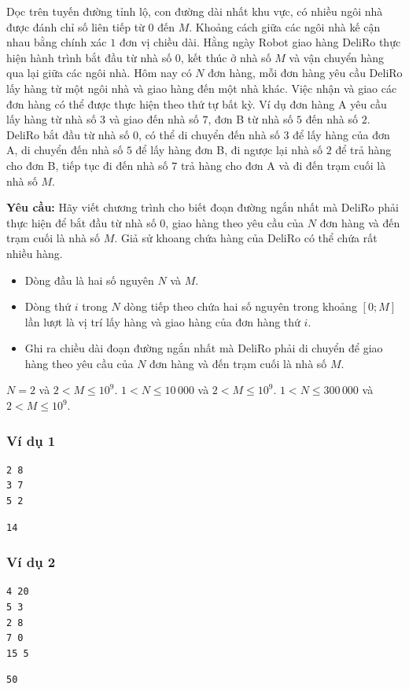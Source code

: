 
Dọc trên tuyến đường tỉnh lộ, con đường dài nhất khu vực, có nhiều ngôi nhà được đánh chỉ số liên tiếp từ $0$ đến $M$. Khoảng cách giữa các ngôi nhà kế cận nhau bằng chính xác $1$ đơn vị chiều dài. Hằng ngày Robot giao hàng DeliRo thực hiện hành trình bắt đầu từ nhà số $0$, kết thúc ở nhà số $M$ và vận chuyển hàng qua lại giữa các ngôi nhà. Hôm nay có $N$ đơn hàng, mỗi đơn hàng yêu cầu DeliRo lấy hàng từ một ngôi nhà và giao hàng đến một nhà khác. Việc nhận và giao các đơn hàng có thể được thực hiện theo thứ tự bất kỳ. Ví dụ đơn hàng A yêu cầu lấy hàng từ nhà số $3$ và giao đến nhà số $7$, đơn B từ nhà số $5$ đến nhà số $2$. DeliRo bắt đầu từ nhà số $0$, có thể di chuyển đến nhà số $3$ để lấy hàng của đơn A, di chuyển đến nhà số $5$ để lấy hàng đơn B, đi ngược lại nhà số $2$ để trả hàng cho đơn B, tiếp tục đi đến nhà số $7$ trả hàng cho đơn A và đi đến trạm cuối là nhà số $M$.

\medskip
\textbf{Yêu cầu:} Hãy viết chương trình cho biết đoạn đường ngắn nhất mà DeliRo phải thực hiện để bắt đầu từ nhà số $0$, giao hàng theo yêu cầu của $N$ đơn hàng và đến trạm cuối là nhà số $M$. Giả sử khoang chứa hàng của DeliRo có thể chứa rất nhiều hàng.

\begin{itemize}
    \item Dòng đầu là hai số nguyên $N$ và $M$.
    \item Dòng thứ $i$ trong $N$ dòng tiếp theo chứa hai số nguyên trong khoảng $[0; M]$ lần lượt là vị trí lấy hàng và giao hàng của đơn hàng thứ $i$.
\end{itemize}

\begin{itemize}
    \item Ghi ra chiều dài đoạn đường ngắn nhất mà DeliRo phải di chuyển để giao hàng theo yêu cầu của $N$ đơn hàng và đến trạm cuối là nhà số $M$.
\end{itemize}

\begin{makesubtasks}
     $N=2$ và $2 < M \le 10^9$.
     $1 < N \le 10\,000$ và $2 < M \le 10^9$.
     $1 < N \le 300\,000$ và $2 < M \le 10^9$.
\end{makesubtasks}


\subsubsection*{Ví dụ 1}
\begin{makesample}
\begin{lstlisting}
2 8
3 7
5 2
\end{lstlisting}
\nextsample
\begin{lstlisting}
14
\end{lstlisting}
\end{makesample}

\subsubsection*{Ví dụ 2}
\begin{makesample}
\begin{lstlisting}
4 20
5 3
2 8
7 0
15 5
\end{lstlisting}
\nextsample
\begin{lstlisting}
50
\end{lstlisting}
\end{makesample}